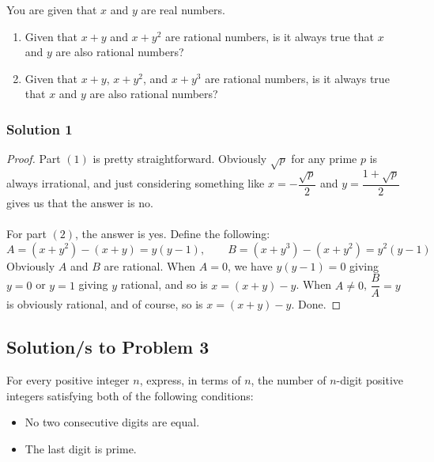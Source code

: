 \documentclass[11pt]{scrartcl}
\begin{document}
\begin{problem}
    You are given that $x$ and $y$ are real numbers.

    \begin{enumerate}
        \item Given that $x+y$ and $x+y^2$ are rational numbers, is it always
        true that $x$ and $y$ are also rational numbers?

        \item Given that $x+y$, $x+y^2$, and $x+y^3$ are rational numbers,
        is it always true that $x$ and $y$ are also rational numbers?
    \end{enumerate}
\end{problem}

\subsubsection{Solution 1}

\begin{proof}
    Part $(1)$ is pretty straightforward. Obviously $\sqrt{p}$ for any prime
    $p$ is always irrational, and just considering something like 
    $x = -\dfrac{\sqrt p}{2}$ and $y = \dfrac{1+\sqrt{p}}{2}$ gives us that 
    the answer is no. \\ \\

    For part $(2)$, the answer is yes. Define the following:
    \[
    A = (x+y^2) - (x+y) = y(y-1), \qquad B = (x+y^3) - (x+y^2) = y^2(y-1)
    \]
    Obviously $A$ and $B$ are rational. When $A = 0$, we have $y(y-1)=0$ giving
    $y=0$ or $y=1$ giving $y$ rational, and so is $x = (x+y)-y$. When $A \neq 0$,
    $\dfrac{B}{A} = y$ is obviously rational, and of course, so is $x = (x+y)-y$. 
    Done.
\end{proof}

\newpage

\subsection{Solution/s to Problem 3}

\begin{problem}
    For every positive integer $n$, express, in terms of $n$, the number
    of $n$-digit positive integers satisfying both of the following conditions:

    \begin{itemize}
        \item No two consecutive digits are equal.
        \item The last digit is prime.
    \end{itemize}
\end{problem}
\end{document}
